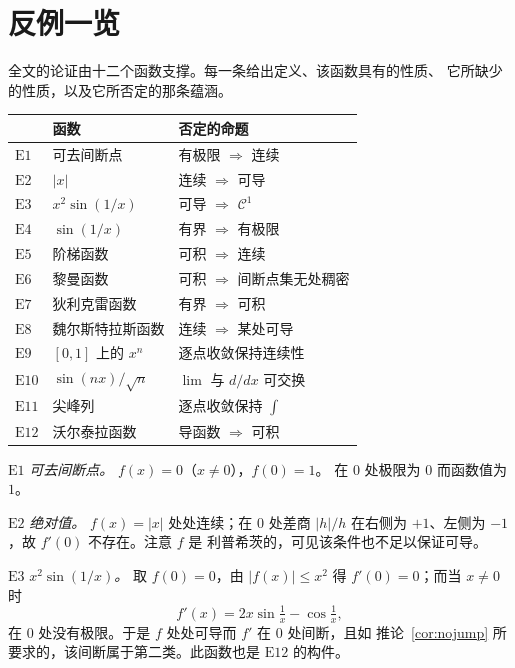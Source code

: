 \section{反例一览}
\label{sec:gallery}

全文的论证由十二个函数支撑。每一条给出定义、该函数具有的性质、
它所缺少的性质，以及它所否定的那条蕴涵。

\begin{center}
\begin{tabular}{@{}lll@{}}
\toprule
& \textbf{函数} & \textbf{否定的命题} \\
\midrule
$\mathrm{E}1$  & 可去间断点          & 有极限 $\Rightarrow$ 连续 \\
$\mathrm{E}2$  & $|x|$               & 连续 $\Rightarrow$ 可导 \\
$\mathrm{E}3$  & $x^2\sin(1/x)$      & 可导 $\Rightarrow$ $\mathscr{C}^1$ \\
$\mathrm{E}4$  & $\sin(1/x)$         & 有界 $\Rightarrow$ 有极限 \\
$\mathrm{E}5$  & 阶梯函数            & 可积 $\Rightarrow$ 连续 \\
$\mathrm{E}6$  & 黎曼函数            & 可积 $\Rightarrow$ 间断点集无处稠密 \\
$\mathrm{E}7$  & 狄利克雷函数        & 有界 $\Rightarrow$ 可积 \\
$\mathrm{E}8$  & 魏尔斯特拉斯函数    & 连续 $\Rightarrow$ 某处可导 \\
$\mathrm{E}9$  & $[0,1]$ 上的 $x^n$  & 逐点收敛保持连续性 \\
$\mathrm{E}10$ & $\sin(nx)/\sqrt n$  & $\lim$ 与 $d/dx$ 可交换 \\
$\mathrm{E}11$ & 尖峰列              & 逐点收敛保持 $\int$ \\
$\mathrm{E}12$ & 沃尔泰拉函数        & 导函数 $\Rightarrow$ 可积 \\
\bottomrule
\end{tabular}
\end{center}

\medskip
\noindent
$\mathrm{E}1$ \emph{可去间断点。} $f(x)=0$（$x\ne0$），$f(0)=1$。
在 $0$ 处极限为 $0$ 而函数值为 $1$。

\smallskip\noindent
$\mathrm{E}2$ \emph{绝对值。} $f(x)=|x|$ 处处连续；在 $0$ 处差商
$|h|/h$ 在右侧为 $+1$、左侧为 $-1$，故 $f'(0)$ 不存在。注意 $f$ 是
利普希茨的，可见该条件也不足以保证可导。

\smallskip\noindent
$\mathrm{E}3$ \emph{$x^2\sin(1/x)$。} 取 $f(0)=0$，由 $|f(x)|\le x^2$
得 $f'(0)=0$；而当 $x\ne0$ 时
\[ f'(x) = 2x\sin\tfrac1x - \cos\tfrac1x, \]
在 $0$ 处没有极限。于是 $f$ 处处可导而 $f'$ 在 $0$ 处间断，且如
推论~\ref{cor:nojump} 所要求的，该间断属于第二类。此函数也是
$\mathrm{E}12$ 的构件。


